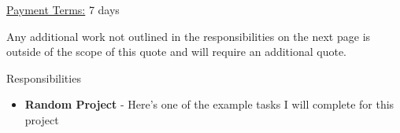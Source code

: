 \documentclass{letter}
\begin{document}
\vspace{3 cm}

\underline{Payment Terms:} 7 days

\vspace{0.5 cm}

\small{Any additional work not outlined in the responsibilities on the next page is outside of the scope of this quote and will require an additional quote.}

\newpage

\Large{Responsibilities}

\begin{itemize}
  \item \textbf{Random Project} - Here's one of the example tasks I will complete for this project

\end{itemize}
\end{document}
